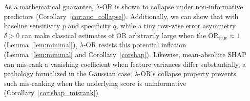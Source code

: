 \documentclass[pdflatex,sn-mathphys-num]{sn-jnl}%
\def\zcor{ZeBRA\xspace}
\newcommand{\SPOR}{\textrm{$\lambda$-OR}}
\theoremstyle{thmstyleone}%
\theoremstyle{thmstyletwo}%
\theoremstyle{thmstylethree}%
\begin{document}
As a mathematical guarantee, $\SPOR$ is shown to collapse under non-informative predictors (Corollary~\ref{cor:auc_collapse}). Additionally, we can show that with baseline sensitivity $p$ and specificity $q$, while  a tiny row-wise error asymmetry $\delta>0$ can make classical estimates of  $\mathrm{OR}$  arbitrarily large when the  $\mathrm{OR}_{\text{true}}\approx 1$ (Lemma~\ref{lem:minimal}), $\SPOR$ resists  this potential  inflation  (Lemma~\ref{lem:minimal} and Corollary~\ref{corshap}). Likewise, mean-absolute SHAP can mis-rank a vanishing coefficient when feature variances differ substantially, a pathology formalized in the Gaussian case; $\SPOR$’s collapse property prevents such mis-ranking when the underlying score is uninformative (Corollary~\ref{cor:shap_misrank}).




\end{document}
